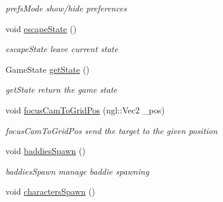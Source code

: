 \begin{DoxyCompactItemize}
\begin{DoxyCompactList}\small\item\em prefs\+Mode show/hide preferences \end{DoxyCompactList}\item 
\hypertarget{class_scene_abace53541c8953cdc68e257b5eed8176}{}void \hyperlink{class_scene_abace53541c8953cdc68e257b5eed8176}{escape\+State} ()\label{class_scene_abace53541c8953cdc68e257b5eed8176}

\begin{DoxyCompactList}\small\item\em escape\+State leave current state \end{DoxyCompactList}\item 
Game\+State \hyperlink{class_scene_a57eddbc5e7d0d4ca4316c407b6367338}{get\+State} ()
\begin{DoxyCompactList}\small\item\em get\+State return the game state \end{DoxyCompactList}\item 
void \hyperlink{class_scene_ab9546d85443d18c0115eeeb07e4297b4}{focus\+Cam\+To\+Grid\+Pos} (ngl\+::\+Vec2 \+\_\+pos)
\begin{DoxyCompactList}\small\item\em focus\+Cam\+To\+Grid\+Pos send the target to the given position \end{DoxyCompactList}\item 
\hypertarget{class_scene_a8c8d724395041f1d1830a936d778f291}{}void \hyperlink{class_scene_a8c8d724395041f1d1830a936d778f291}{baddies\+Spawn} ()\label{class_scene_a8c8d724395041f1d1830a936d778f291}

\begin{DoxyCompactList}\small\item\em baddies\+Spawn manage baddie spawning \end{DoxyCompactList}\item 
\hypertarget{class_scene_a4a22ab4d4d660a71d70933758d367395}{}void \hyperlink{class_scene_a4a22ab4d4d660a71d70933758d367395}{characters\+Spawn} ()\label{class_scene_a4a22ab4d4d660a71d70933758d367395}


\end{DoxyCompactItemize}
